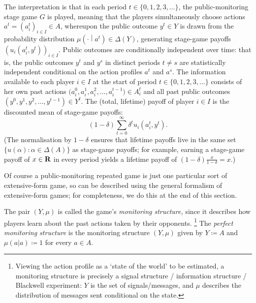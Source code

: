 The interpretation is that in each period $t \in \{0,1,2,3,\dots\}$, the public-monitoring stage game $G$ is played, meaning that the players simultaneously choose actions $a^t = \left(a_i^t\right)_{i \in I} \in A$, whereupon the public outcome $y^t \in Y$ is drawn from the probability distribution $\mu\left(\cdot\middle|a^t\right) \in \Delta(Y)$, generating stage-game payoffs $\left(u_i\left(a_i^t,y^t\right)\right)_{i \in I}$. Public outcomes are conditionally independent over time: that is, the public outcomes $y^t$ and $y^s$ in distinct periods $t \neq s$ are statistically independent conditional on the action profiles $a^t$ and $a^s$. The information available to each player $i \in I$ at the start of period $t \in \{0,1,2,3,\dots\}$ consists of her own past actions $\bigl( a_i^0, a_i^1, a_i^2, \dots, a_i^{t-1} \bigr) \in A_i^t$ and all past public outcomes $(y^0,y^1,y^2,\dots,y^{t-1}) \in Y^t$. The (total, lifetime) payoff of player $i \in I$ is the discounted mean of stage-game payoffs:
%
\begin{equation*}
	(1-\delta) \sum_{t=0}^\infty \delta^t u_i\left( a_i^t, y^t \right) .
\end{equation*}
%
(The normalisation by $1-\delta$ ensures that lifetime payoffs live in the same set $\{ u(\alpha) : \alpha \in \Delta(A) \}$ as stage-game payoffs; for example, earning a stage-game payoff of $x \in \mathbf{R}$ in every period yields a lifetime payoff of $(1-\delta) \frac{x}{1-\delta} = x$.)

Of course a public-monitoring repeated game is just one particular sort of extensive-form game, so can be described using the general formalism of extensive-form games; for completeness, we do this at the end of this section.

The pair $(Y,\mu)$ is called the game's \emph{monitoring structure,} since it describes how players learn about the past actions taken by their opponents.%
	\footnote{Viewing the action profile as a `state of the world' to be estimated, a monitoring structure is precisely a signal structure / information structure / Blackwell experiment: $Y$ is the set of signals/messages, and $\mu$ describes the distribution of messages sent conditional on the state.}
The \emph{perfect monitoring structure} is the monitoring structure $(Y,\mu)$ given by $Y \coloneqq A$ and $\mu(a|a) \coloneqq 1$ for every $a \in A$.

